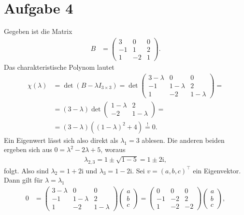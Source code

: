 \documentclass[english, parskip=full]{scrartcl}
\newcommand{\kla}{}
\renewcommand{\i}{\text{i}}
\begin{document}
\section*{Aufgabe 4}
Gegeben ist die Matrix
\begin{align}
B &= \begin{pmatrix}
3 & 0 & 0 \\ -1 & 1 & 2 \\ 1 & -2 & 1
\end{pmatrix}.
\end{align}
Das charakteristische Polynom lautet
\begin{align}
\chi(\lambda) &= \det\kla\left( B - \lambda I_{3\times 3} \right) = \det\begin{pmatrix}
3-\lambda & 0 & 0 \\ -1 & 1-\lambda & 2 \\ 1 & -2 & 1-\lambda
\end{pmatrix} = \\
&= (3-\lambda) \det\begin{pmatrix}
1-\lambda & 2 \\ -2 & 1 -\lambda
\end{pmatrix} = \\
&= (3-\lambda) \kla\left( (1-\lambda)^2 + 4 \right) \overset{!}{=} 0.
\end{align}
Ein Eigenwert lässt sich also direkt als $\lambda_1=3$ ablesen.
Die anderen beiden ergeben sich aus $0 = \lambda^2 - 2\lambda + 5$, woraus 
\begin{align}
\lambda_{2,3} = 1 \pm \sqrt{1 - 5} = 1 \pm 2\i,
\end{align}
folgt.
Also sind $\lambda_2 = 1 + 2\i$ und $\lambda_3 = 1 - 2\i$.
Sei $v=(a,b,c)^\top$ ein Eigenvektor. 
Dann gilt für $\lambda=\lambda_1$
\begin{align}
0 &= \begin{pmatrix}
3-\lambda & 0 & 0 \\ -1 & 1-\lambda & 2 \\ 1 & -2 & 1-\lambda
\end{pmatrix} \begin{pmatrix}
a \\ b \\ c
\end{pmatrix} = \begin{pmatrix}
0 & 0 & 0 \\ -1 & -2 & 2 \\ 1 & -2 & -2
\end{pmatrix} \begin{pmatrix}
a \\ b \\ c
\end{pmatrix},
\end{align}
\end{document}
